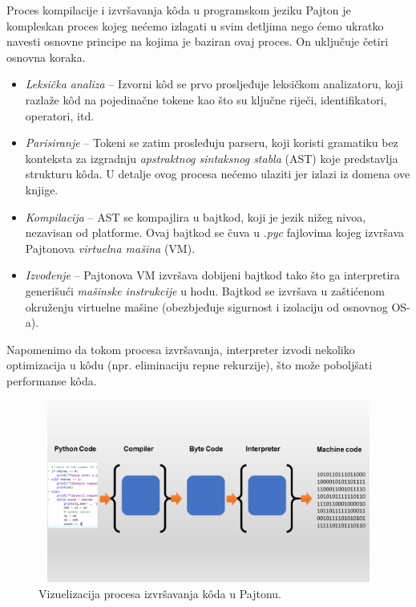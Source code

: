 Proces kompilacije   i izvršavanja k\^oda u programskom jeziku Pajton je kompleskan proces kojeg nećemo izlagati u svim detljima nego ćemo ukratko navesti osnovne principe na kojima je baziran ovaj proces. On uključuje četiri osnovna koraka.
\begin{itemize}
	\item \textit{Leksička analiza} -- Izvorni k\^od se prvo prosljeđuje leksičkom analizatoru,  koji razlaže k\^od na pojedinačne tokene kao što su ključne riječi, identifikatori, operatori, itd.
	\item \textit{Parisiranje} -- Tokeni se zatim prosleđuju parseru, koji koristi gramatiku bez konteksta za izgradnju \emph{apstraktnog sintaksnog stabla} (AST) koje predstavlja strukturu k\^oda. U detalje ovog procesa nećemo ulaziti jer izlazi iz domena ove knjige.
	\item \textit{Kompilacija} -- AST se kompajlira u bajtkod, koji je jezik nižeg nivoa,   nezavisan od platforme.  Ovaj bajtkod se čuva u .\textit{pyc} fajlovima kojeg izvršava   Pajtonova \textit{virtuelna mašina} (VM).
	\item \textit{Izvođenje} -- Pajtonova VM izvršava dobijeni bajtkod tako što ga interpretira generišući \textit{mašinske instrukcije} u hodu. Bajtkod se izvršava u zaštićenom okruženju virtuelne mašine (obezbjeđuje sigurnost i izolaciju od osnovnog OS-a).  
	
\end{itemize}
Napomenimo da tokom procesa izvršavanja, interpreter izvodi nekoliko optimizacija u k\^odu (npr. eliminaciju repne rekurzije), što može poboljšati performanse k\^oda.
\begin{figure}[H]	
	\centering
	
	\includegraphics[width=350pt,height=170pt]{slike/python-code-copiler-machine-code.png}%
\caption{Vizuelizacija procesa izvršavanja k\^oda u Pajtonu.\protect\footnotemark}
\label{fig:comp_interpreting}
\end{figure}

